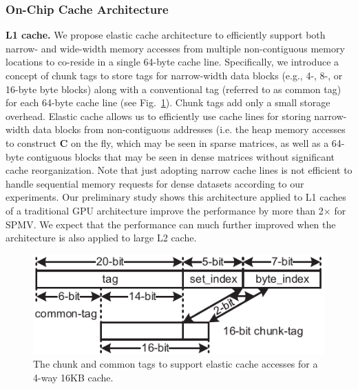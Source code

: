 \subsubsection{On-Chip Cache Architecture} 
\label{sec:memory:on-chip}
\noindent
\textbf{L1 cache.}
We propose elastic cache architecture to efficiently support both narrow- and wide-width memory accesses from multiple non-contiguous memory locations to co-reside in a single 64-byte cache line. 
Specifically, we introduce a concept of chunk tags to store tags for narrow-width data blocks (e.g., 4-, 8-, or 16-byte byte blocks) along with a conventional tag (referred to as common tag) for each 64-byte cache line (see Fig.~\ref{fig:elastic-cache}). 
Chunk tags add only a small storage overhead. 
Elastic cache allows us to efficiently use cache lines for storing narrow-width data blocks from non-contiguous addresses (i.e. the heap memory accesses to construct \textbf{C} on the fly, 
which may be seen in sparse matrices, as well as a 64-byte contiguous blocks that may be seen in dense matrices without significant cache reorganization. 
Note that just adopting narrow cache lines is not efficient to handle sequential memory requests for dense datasets according to our experiments.
Our preliminary study shows this architecture applied to L1 caches of a traditional GPU architecture improve the performance by more than 2$\times$ for SPMV.
We expect that the performance can much further improved when the architecture is also applied to large L2 cache.



\begin{figure}
\center
\includegraphics[width=1.0\linewidth]{./fig/chunk_tag_16bit-eps-converted-to.pdf}
\caption{The chunk and common tags to support elastic cache accesses for a 4-way 16KB cache.}
\label{fig:elastic-cache}
\end{figure}


